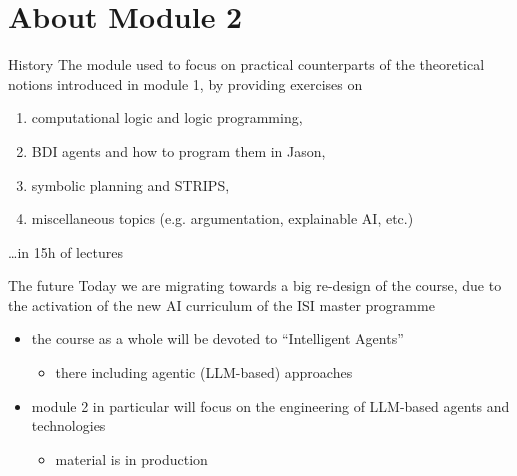 \documentclass[presentation]{beamer}\mode<presentation>{\usetheme{AMSBolognaFC}}
\begin{document}
\section{About Module 2}

\begin{frame}[c]{History}
The module used to focus on practical counterparts of the theoretical notions introduced in module 1, 
by providing exercises on
\begin{enumerate}
	\item computational logic and logic programming,
	\item BDI agents and how to program them in Jason,
	\item symbolic planning and \textsc{STRIPS},
	\item miscellaneous topics (e.g. argumentation, explainable AI, etc.)
\end{enumerate}
\ldots \alert{in 15h of lectures}
\end{frame}

\begin{frame}[c]{The future}
Today we are migrating towards a big \alert{re-design} of the course, due to the activation of the new \alert{AI curriculum} of the ISI master programme
\begin{itemize}
	\item the course as a whole will be devoted to \alert{``Intelligent Agents''}
	\begin{itemize}
		\item there including \alert{agentic} (LLM-based) approaches
	\end{itemize}
	\item module 2 in particular will focus on the engineering of LLM-based agents and technologies
	\begin{itemize}
		\item material is in production
	\end{itemize}
\end{itemize}
\end{frame}
\end{document}
